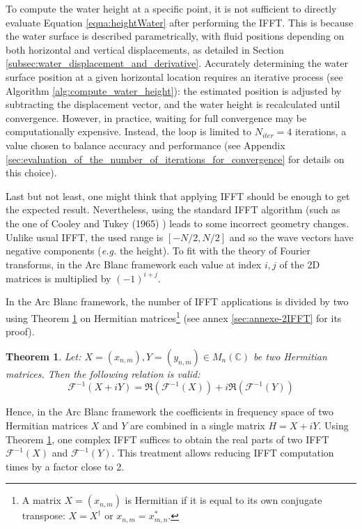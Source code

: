 \documentclass[final]{jcgt}
\newtheorem{theorem}{Theorem}
\def\framework{the Arc Blanc framework\xspace}
\begin{document}
To compute the water height at a specific point, it is not sufficient to directly evaluate Equation \ref{equa:heightWater} after performing the IFFT. This is because the water surface is described parametrically, with fluid positions depending on both horizontal and vertical displacements, as detailed in Section \ref{subsec:water_displacement_and_derivative}. Accurately determining the water surface position at a given horizontal location requires an iterative process (see Algorithm \ref{alg:compute_water_height}): the estimated position is adjusted by subtracting the displacement vector, and the water height is recalculated until convergence. However, in practice, waiting for full convergence may be computationally expensive. Instead, the loop is limited to $N_{iter}=4$ iterations, a value chosen to balance accuracy and performance (see Appendix \ref{sec:evaluation_of_the_number_of_iterations_for_convergence} for details on this choice).





Last but not least, one might think that applying IFFT should be enough to get the expected result.
Nevertheless, using the standard IFFT algorithm (such as the one of Cooley and Tukey (1965) \cite{cooleyAlgorithmMachineCalculation1965}) leads to some incorrect geometry changes.
Unlike usual IFFT, the used range is $\left[-N/2, N/2\right]$ and so the wave vectors have negative components (\emph{e.g.} the height).
To fit with the theory of Fourier transforms, in \framework each value at index $i,j$ of the 2D matrices is multiplied by $(-1)^{i+j}$.

In \framework, the number of IFFT applications is divided by two using Theorem \ref{theorem:ifft} on Hermitian matrices\footnote{A matrix $X=(x_{n,m})$ is Hermitian if it is equal to its own conjugate transpose: $X = X^{\dagger}$ or $x_{n,m}=x^*_{m,n}$.} (see annex \ref{sec:annexe-2IFFT} for its proof).
\begin{theorem}
	\label{theorem:ifft}
	Let: $X=(x_{n,m}), Y=(y_{n,m}) \in M_n(\mathbb{C})$ be two Hermitian matrices.
	Then the following relation is valid:
	\begin{equation}
		\mathcal{F}^{-1}\left(X+iY\right) =
		\Re\left(\mathcal{F}^{-1}\left(X\right)\right)
		+ i\Re\left(\mathcal{F}^{-1}\left(Y\right)\right)
	\end{equation}
\end{theorem}
Hence, in \framework the coefficients in frequency space of two Hermitian matrices $X$ and $Y$ are combined in a single matrix $H=X+iY$.
Using Theorem \ref{theorem:ifft}, one complex IFFT suffices to obtain the real parts of two IFFT $\mathcal{F}^{-1}\left(X\right)$ and $\mathcal{F}^{-1}\left(Y\right)$.
This treatment allows reducing IFFT computation times by a factor close to 2.
\end{document}
